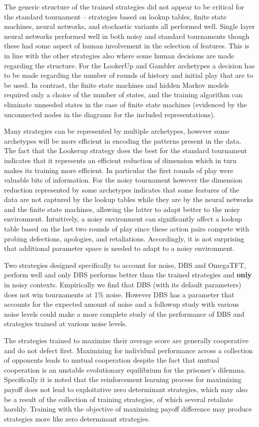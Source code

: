 \documentclass[10pt,letterpaper]{article}
\begin{document}
The generic structure of the trained strategies did not appear to be
critical for the standard tournament -- strategies based on lookup tables,
finite state machines, neural networks, and stochastic variants all performed well.
Single layer neural networks performed well in both
noisy and standard tournaments
though these had some aspect of human involvement in the selection of features.
This is in line with the other strategies also where some human decisions are made
regarding the structure. For the LookerUp and Gambler archetypes
a decision has to be made
regarding the number of rounds of history and initial play that are to be used.
In contrast, the finite state machines and hidden Markov models
 required only a choice of the number
of states, and the training algorithm can eliminate unneeded states in the case
of finite state machines (evidenced by the unconnected nodes in the diagrams
for the included representations).

Many strategies can be represented by multiple archetypes, however some
archetypes will be more efficient in encoding the patterns present in the data.
The fact that the Lookerup strategy does the best for the standard
tournament indicates that it represents an efficient reduction of
dimension which in turn makes its training more efficient. In particular the
first rounds of play were valuable bits of information. For the noisy
tournament however the dimension reduction represented by some archetypes
indicates that some features of the data are not captured by the lookup
tables while they are by the neural networks and the finite state machines,
allowing the latter to adapt better to the noisy environment. Intuitively, a noisy
environment can significantly affect a lookup table based on the last two rounds
of play since these action pairs compete with probing defections, apologies, and
retaliations. Accordingly, it is not surprising that additional parameter space
is needed to adapt to a noisy environment.

Two strategies designed specifically to account for noise,
DBS and OmegaTFT, perform well and only DBS performs better than the trained
strategies and \textbf{only} in noisy contexts. Empirically we find that
DBS (with its default parameters) does not win tournaments at 1\% noise.
However DBS has a parameter that accounts for the expected amount of noise and a
followup study with various noise levels could make a more complete study of
the performance of DBS and strategies trained at various noise levels.

The strategies trained to maximize their average score are generally
cooperative and do not defect first. Maximizing for individual
performance across a collection of opponents leads to mutual cooperation despite
the fact that mutual cooperation is an unstable evolutionary equilibrium for the prisoner's
dilemma. Specifically it is noted that the reinforcement learning process for maximizing
payoff does not lead to exploitative zero determinant strategies, which may also
be a result of the collection of training strategies, of which several retaliate
harshly. Training with the objective of maximizing payoff difference may
produce strategies more like zero determinant strategies.
\end{document}
